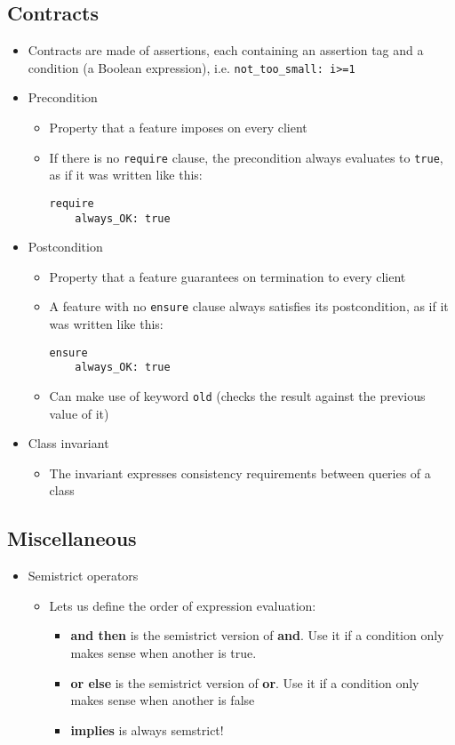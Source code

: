 \documentclass[a4paper]{article}
\newcommand{\inline}[1]{\lstinline!#1!}%
\begin{document}
\subsection{Contracts}
\begin{itemize}
\item Contracts are made of assertions, each containing an assertion tag and a condition (a Boolean expression), i.e. \inline{not_too_small: i>=1}
\item Precondition
\begin{itemize}
\item Property that a feature imposes on every client
\item If there is no \inline{require} clause, the precondition always evaluates to \inline{true}, as if it was written like this:
\begin{lstlisting}
require
	always_OK: true
\end{lstlisting}
\end{itemize}
\item Postcondition
\begin{itemize}
\item Property that a feature guarantees on termination to every client
\item A feature with no \inline{ensure} clause always satisfies its postcondition, as if it was written like this:
\begin{lstlisting}
ensure
	always_OK: true
\end{lstlisting}
\item Can make use of keyword \inline{old} (checks the result against the previous value of it)
\end{itemize}
\item Class invariant
\begin{itemize}
\item The invariant expresses consistency requirements between queries of a class
\end{itemize}
\end{itemize}

\subsection{Miscellaneous}
\begin{itemize}
\item Semistrict operators
\begin{itemize}
\item Lets us define the order of expression evaluation:
\begin{itemize}
\item \textbf{and then} is the semistrict version of \textbf{and}. Use it if a condition only makes sense when another is true.
\item \textbf{or else} is the semistrict version of \textbf{or}. Use it if a condition only makes sense when another is false
\item\textbf{implies} is always semstrict!
\end{itemize}
\end{itemize}
\end{itemize}
\end{document}
